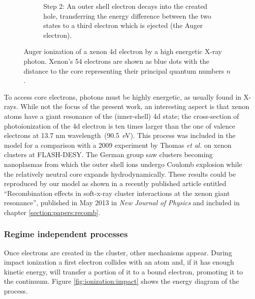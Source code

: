 \begin{figure}
\begin{subfigure}[t]{0.45\columnwidth}
        \caption{Step 2: An outer shell electron decays into the created hole,
                 transferring the energy difference between the two states to a
                 third electron which is ejected (the Auger electron).}
        \label{fig:auger:2}
    \end{subfigure}
        \caption{\label{fig:auger}Auger ionization of a xenon 4d electron by a
                 high energetic X-ray photon. Xenon's 54 electrons are shown
                 as blue dots with the distance to the core representing their
                 principal quantum numbers $n$.}
\end{figure}

To access core electrons, photons must be highly energetic, as usually found in X-rays.
While not the focus of the present work, an interesting aspect is that xenon
atoms have a giant resonance of the (inner-shell) 4d state; the cross-section of
photoionization of the 4d electron is ten times larger than the
one of valence  electrons at 13.7 nm wavelength~(90.5~eV)\cite{Becker1986}.
This process was included in the model for a comparison with a 2009 experiment
by Thomas \textit{et al.}\cite{Thomas2009} on xenon clusters at FLASH-DESY.
The German group saw clusters becoming nanoplasmas from which the outer shell
ions undergo Coulomb explosion while the relatively neutral core expands
hydrodynamically. These results could be reproduced by our model as shown in a recently
published article entitled ``Recombination effects in soft-x-ray cluster
interactions at the xenon giant resonance'', published in May 2013 in
\textit{New Journal of Physics}\cite{Ackad2013} and included in chapter
\ref{section:papers:recomb}.

\subsubsection{Regime independent processes}
\label{section:intro:mechanisms:noregime}

Once electrons are created in the cluster, other mechanisms appear. During
impact ionization a first electron collides with an atom and, if it has enough
kinetic energy, will transfer a portion of it to a bound electron, promoting it
to the continuum. Figure \ref{fig:ionization:impact} shows the energy diagram
of the process.

